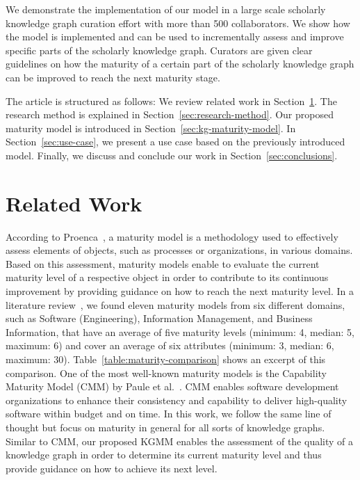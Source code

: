 \documentclass[runningheads]{llncs}
\begin{document}
We demonstrate the implementation of our model in a large scale scholarly knowledge graph curation effort with more than 500 collaborators. We show how the model is implemented and can be used to incrementally assess and improve specific parts of the scholarly knowledge graph. Curators are given clear guidelines on how the maturity of a certain part of the scholarly knowledge graph can be improved to reach the next maturity stage.

The article is structured as follows: 
We review related work in Section~\ref{sec:related}. 
The research method is explained in Section~\ref{sec:research-method}.
Our proposed maturity model is introduced in Section~\ref{sec:kg-maturity-model}. 
In Section~\ref{sec:use-case}, we present a use case based on the previously introduced model. 
Finally, we discuss and conclude our work in Section~\ref{sec:conclusions}.

\section{Related Work}
\label{sec:related}
According to Proenca~\cite{proenca_methods_2016}, a maturity model is a methodology used to effectively assess elements of objects, such as processes or organizations, in various domains. Based on this assessment, maturity models enable to evaluate the current maturity level of a respective object in order to contribute to its continuous improvement by providing guidance on how to reach the next maturity level. In a literature review~\cite{orkg_comparison_maturity_models}, we found eleven maturity models  from six different domains, such as Software (Engineering), Information Management, and Business Information, that have an average of five maturity levels (minimum: 4, median: 5, maximum: 6) and cover an average of six attributes (minimum: 3, median: 6, maximum: 30). Table~\ref{table:maturity-comparison} shows an excerpt of this comparison. One of the most well-known maturity models is the Capability Maturity Model (CMM) by Paule et al.~\cite{CMMI-Paulk}. CMM enables software development organizations to enhance their consistency and capability to deliver high-quality software within budget and on time. In this work, we follow the same line of thought but focus on maturity in general for all sorts of knowledge graphs. Similar to CMM, our proposed KGMM enables the assessment of the quality of a knowledge graph in order to determine its current maturity level and thus provide guidance on how to achieve its next level.
\end{document}
